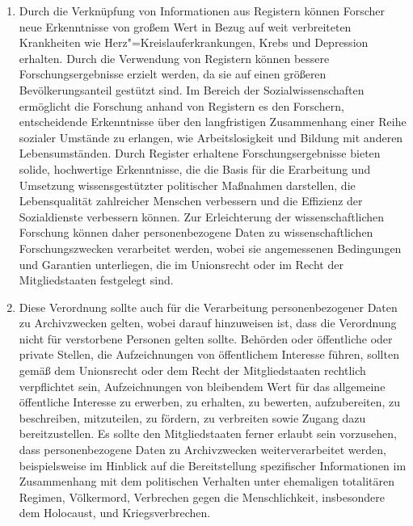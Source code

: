 \begin{enumerate}

   \item Durch die Verknüpfung von Informationen aus Registern können Forscher neue Erkenntnisse von großem Wert in
    Bezug auf weit verbreiteten Krankheiten wie Herz"=Kreislauferkrankungen, Krebs und Depression erhalten. Durch die
    Verwendung von Registern können bessere Forschungsergebnisse erzielt werden, da sie auf einen größeren
    Bevölkerungsanteil gestützt sind. Im Bereich der Sozialwissenschaften ermöglicht die Forschung anhand von Registern
    es den Forschern, entscheidende Erkenntnisse über den langfristigen Zusammenhang einer Reihe sozialer Umstände zu
    erlangen, wie Arbeitslosigkeit und Bildung mit anderen Lebensumständen. Durch Register erhaltene
    Forschungsergebnisse bieten solide, hochwertige Erkenntnisse, die die Basis für die Erarbeitung und Umsetzung
    wissensgestützter politischer Maßnahmen darstellen, die Lebensqualität zahlreicher Menschen verbessern und die
    Effizienz der Sozialdienste verbessern können. Zur Erleichterung der wissenschaftlichen Forschung können daher
    personenbezogene Daten zu wissenschaftlichen Forschungszwecken verarbeitet werden, wobei sie angemessenen
    Bedingungen und Garantien unterliegen, die im Unionsrecht oder im Recht der Mitgliedstaaten festgelegt sind.%
   \label{eg:157}
   

   \item Diese Verordnung sollte auch für die Verarbeitung personenbezogener Daten zu Archivzwecken gelten, wobei darauf
    hinzuweisen ist, dass die Verordnung nicht für verstorbene Personen gelten sollte. Behörden oder öffentliche oder
    private Stellen, die Aufzeichnungen von öffentlichem Interesse führen, sollten gemäß dem Unionsrecht oder dem Recht
    der Mitgliedstaaten rechtlich verpflichtet sein, Aufzeichnungen von bleibendem Wert für das allgemeine öffentliche
    Interesse zu erwerben, zu erhalten, zu bewerten, aufzubereiten, zu beschreiben, mitzuteilen, zu fördern, zu
    verbreiten sowie Zugang dazu bereitzustellen. Es sollte den Mitgliedstaaten ferner erlaubt sein vorzusehen, dass
    personenbezogene Daten zu Archivzwecken weiterverarbeitet werden, beispielsweise im Hinblick auf die Bereitstellung
    spezifischer Informationen im Zusammenhang mit dem politischen Verhalten unter ehemaligen totalitären Regimen,
    Völkermord, Verbrechen gegen die Menschlichkeit, insbesondere dem Holocaust, und Kriegsverbrechen.%
   \label{eg:158}
   

\end{enumerate}
